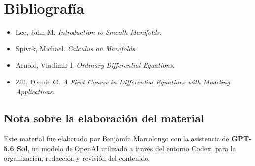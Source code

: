 \documentclass[12pt,a4paper]{article}
\begin{document}
	\section*{Bibliografía}

	\begin{itemize}[leftmargin=*]
		\item Lee, John M. \textit{Introduction to Smooth Manifolds}.
		\item Spivak, Michael. \textit{Calculus on Manifolds}.
		\item Arnold, Vladimir I. \textit{Ordinary Differential Equations}.
		\item Zill, Dennis G. \textit{A First Course in Differential Equations with Modeling Applications}.
	\end{itemize}

	\subsection*{Nota sobre la elaboración del material}

	Este material fue elaborado por Benjamín Marcolongo con la asistencia de \textbf{GPT-5.6 Sol}, un modelo de OpenAI utilizado a través del entorno Codex, para la organización, redacción y revisión del contenido.
\end{document}
